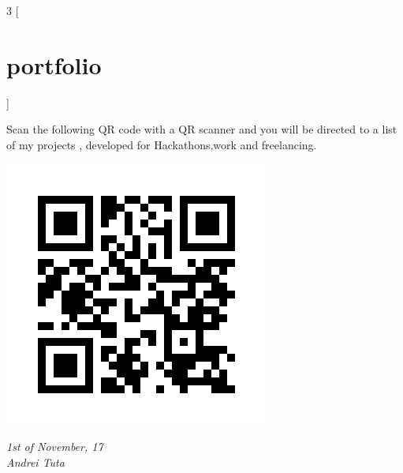 \documentclass[]{friggeri-cv}
\begin{document}
\begin{multicols}{3}
[
\section{portfolio}
]

Scan the following QR code with a QR scanner and you will be directed to a list of my projects , developed for Hackathons,work and freelancing.
    
    \includegraphics[scale=0.20]{img/static_qr_code_without_logo.jpg}
 


\begin{flushright}
\emph{1st of November, 17}
\\
\emph{Andrei Tuta}
\end{flushright}

   
\end{multicols}
\end{document}
